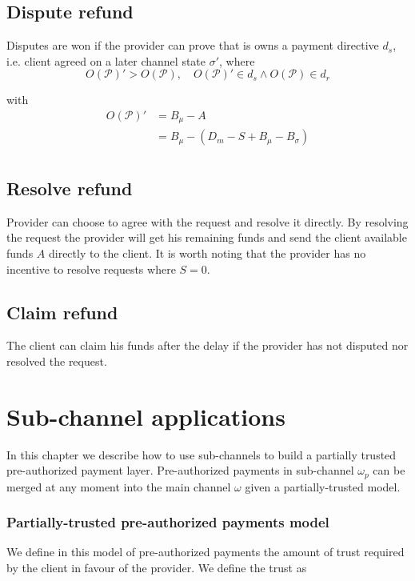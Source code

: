 \documentclass{llncs}
\begin{document}
\subsection{Dispute refund} Disputes are won if the provider can prove that is owns a payment directive $d_s$, i.e. client agreed on a later channel state $\sigma'$, where
$$O(\mathcal{P})' > O(\mathcal{P}), \quad O(\mathcal{P})' \in d_s \land O(\mathcal{P}) \in d_r$$

with
\begin{equation*}
\begin{split}
    O(\mathcal{P})' &= B_\mu - A \\
    &= B_\mu - (D_m - S + B_\mu - B_\sigma) \\
\end{split}
\end{equation*}

\subsection{Resolve refund} Provider can choose to agree with the request and resolve it directly. By resolving the request the provider will get his remaining funds and send the client available funds $A$ directly to the client. It is worth noting that the provider has no incentive to resolve requests where $S = 0$.

\subsection{Claim refund} The client can claim his funds after the delay if the provider has not disputed nor resolved the request.

\section{Sub-channel applications} In this chapter we describe how to use sub-channels to build a partially trusted pre-authorized payment layer. Pre-authorized payments in sub-channel $\omega_p$ can be merged at any moment into the main channel $\omega$ given a partially-trusted model.

\subsubsection{Partially-trusted pre-authorized payments model} We define in this model of pre-authorized payments the amount of trust required by the client in favour of the provider. We define the trust as
\end{document}
